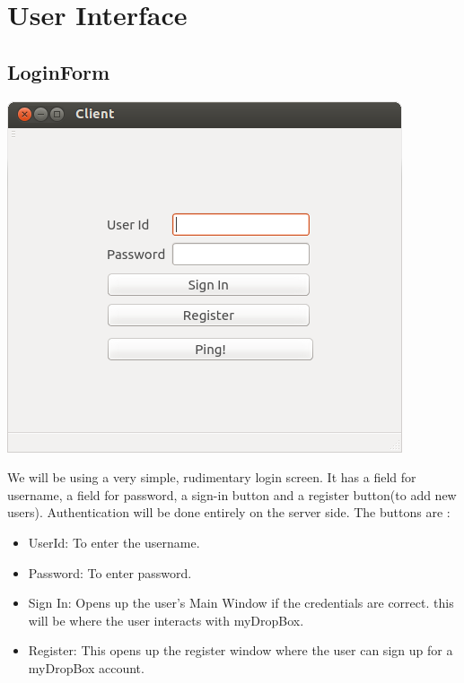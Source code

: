 \documentclass[]{article}
\begin{document}
\section{\LARGE User Interface}
\subsection{LoginForm}
\begin{center}
\includegraphics[scale=0.4]{images/img_login.png}
\end{center}
We will be using a very simple, rudimentary login screen. It has a field for username, a field for password, a sign-in button and a register button(to add new users). Authentication will be done entirely on the server side. 
The buttons are :
\begin{itemize}
\item UserId: To enter the username.
\item Password: To enter password.
\item Sign In: Opens up the user's Main Window if the credentials are correct. this will be where the user interacts with myDropBox.
\item Register: This opens up the register window where the user can sign up for a myDropBox account.
\end{itemize}
\end{document}
